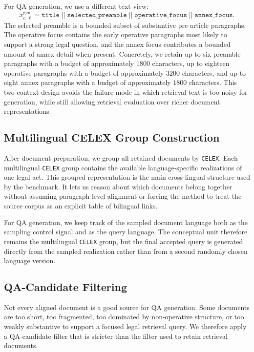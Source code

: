 For QA generation, we use a different text view:
\[
x^{\mathrm{gen}}_{c,\ell} =
\texttt{title}
\; || \;
\texttt{selected\_preamble}
\; || \;
\texttt{operative\_focus}
\; || \;
\texttt{annex\_focus}.
\]
The selected preamble is a bounded subset of substantive pre-article paragraphs. The operative focus contains the early operative paragraphs most likely to support a strong legal question, and the annex focus contributes a bounded amount of annex detail when present. Concretely, we retain up to six preamble paragraphs with a budget of approximately \(1800\) characters, up to eighteen operative paragraphs with a budget of approximately \(3200\) characters, and up to eight annex paragraphs with a budget of approximately \(1800\) characters. This two-context design avoids the failure mode in which retrieval text is too noisy for generation, while still allowing retrieval evaluation over richer document representations.

\subsection{Multilingual CELEX Group Construction}

After document preparation, we group all retained documents by \texttt{CELEX}. Each multilingual \texttt{CELEX} group contains the available language-specific realizations of one legal act. This grouped representation is the main cross-lingual structure used by the benchmark. It lets us reason about which documents belong together without assuming paragraph-level alignment or forcing the method to treat the source corpus as an explicit table of bilingual links.

For QA generation, we keep track of the sampled document language both as the sampling control signal and as the query language. The conceptual unit therefore remains the multilingual \texttt{CELEX} group, but the final accepted query is generated directly from the sampled realization rather than from a second randomly chosen language version.

\subsection{QA-Candidate Filtering}

Not every aligned document is a good source for QA generation. Some documents are too short, too fragmented, too dominated by non-operative structure, or too weakly substantive to support a focused legal retrieval query. We therefore apply a QA-candidate filter that is stricter than the filter used to retain retrieval documents.

